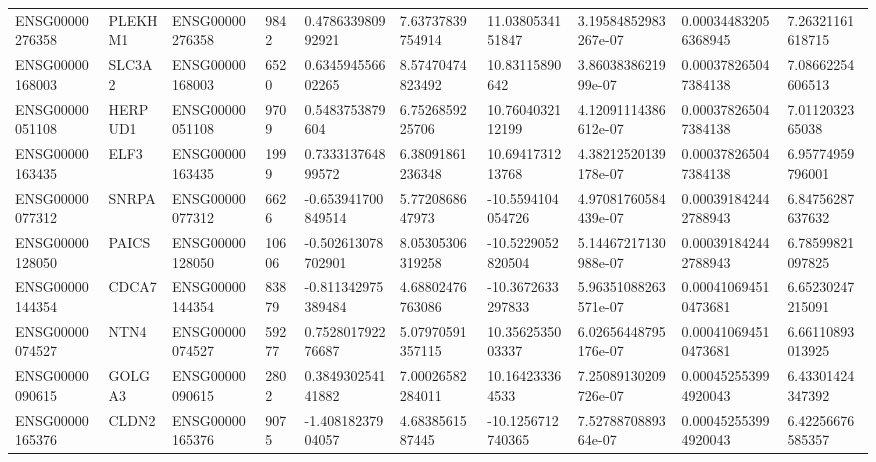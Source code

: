 \begin{tabular}{@{}llllllllll@{}}
ENSG00000276358 & PLEKHM1 & ENSG00000276358 & 9842 & 0.478633980992921 & 7.63737839754914 & 11.0380534151847 & 3.19584852983267e-07 & 0.000344832056368945 & 7.26321161618715 \\
ENSG00000168003 & SLC3A2 & ENSG00000168003 & 6520 & 0.634594556602265 & 8.57470474823492 & 10.83115890642 & 3.8603838621999e-07 & 0.000378265047384138 & 7.08662254606513 \\
ENSG00000051108 & HERPUD1 & ENSG00000051108 & 9709 & 0.5483753879604 & 6.7526859225706 & 10.7604032112199 & 4.12091114386612e-07 & 0.000378265047384138 & 7.0112032365038 \\
ENSG00000163435 & ELF3 & ENSG00000163435 & 1999 & 0.733313764899572 & 6.38091861236348 & 10.6941731213768 & 4.38212520139178e-07 & 0.000378265047384138 & 6.95774959796001 \\
ENSG00000077312 & SNRPA & ENSG00000077312 & 6626 & -0.653941700849514 & 5.7720868647973 & -10.5594104054726 & 4.97081760584439e-07 & 0.000391842442788943 & 6.84756287637632 \\
ENSG00000128050 & PAICS & ENSG00000128050 & 10606 & -0.502613078702901 & 8.05305306319258 & -10.5229052820504 & 5.14467217130988e-07 & 0.000391842442788943 & 6.78599821097825 \\
ENSG00000144354 & CDCA7 & ENSG00000144354 & 83879 & -0.811342975389484 & 4.68802476763086 & -10.3672633297833 & 5.96351088263571e-07 & 0.000410694510473681 & 6.65230247215091 \\
ENSG00000074527 & NTN4 & ENSG00000074527 & 59277 & 0.752801792276687 & 5.07970591357115 & 10.3562535003337 & 6.02656448795176e-07 & 0.000410694510473681 & 6.66110893013925 \\
ENSG00000090615 & GOLGA3 & ENSG00000090615 & 2802 & 0.384930254141882 & 7.00026582284011 & 10.164233364533 & 7.25089130209726e-07 & 0.000452553994920043 & 6.43301424347392 \\
ENSG00000165376 & CLDN2 & ENSG00000165376 & 9075 & -1.40818237904057 & 4.6838561587445 & -10.1256712740365 & 7.5278870889364e-07 & 0.000452553994920043 & 6.42256676585357 \\
\bottomrule
\end{tabular}
\endgroup

